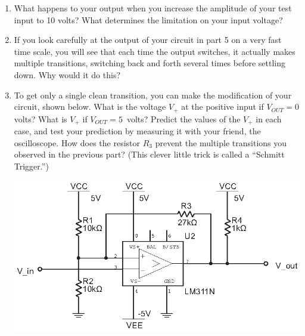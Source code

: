\begin{enumerate}[wide]
\pagebreak[2]

\item What happens to your output when you increase the amplitude of your test input to 10 volts?  What determines the limitation on your input voltage?

\item If you look carefully at the output of your circuit in part 5 on a very fast time scale, you will see that each time the output switches, it actually makes multiple transitions, switching back and forth several times before settling down.  Why would it do this?  

\item To get only a single clean transition, you can make the modification of your circuit, shown below.  What is the voltage $V_+$ at the positive input if $V_{OUT}=0$ volts?  What is $V_+$ if $V_{OUT}=5$~volts?   Predict the values of the $V_+$ in each case, and test your prediction by measuring it with your friend, the oscilloscope.  How does the resistor $R_3$ prevent the multiple transitions you observed in the previous part?  (This clever little trick is called a ``Schmitt Trigger.'') \label{part_schmitt_trigger}

\begin{center}
\includegraphics{digital_electronics/schmitt_trigger.eps}
\end{center}


\end{enumerate}



